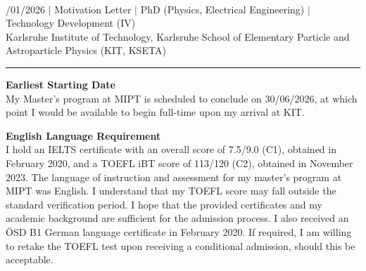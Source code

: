 \documentclass[a4paper,12pt]{article}
\begin{document}
{\centering
  {\scshape {}} \\ 
  {\fontsize{10}{10}/01/2026} $|$
  {\fontsize{10}{10}\selectfont Motivation Letter} $|$
  {\fontsize{10}{10}\selectfont PhD (Physics, Electrical Engineering)} $|$
  {\fontsize{10}{10}\selectfont Technology Development (IV)} \\ 
  {\fontsize{10}{10}\selectfont Karlsruhe Institute of Technology, Karlsruhe
  School of Elementary Particle and Astroparticle Physics (KIT, KSETA)}
\par}
\vspace{-15pt}
\noindent\rule{\textwidth}{0.5pt}

\vspace{-10pt}

\noindent \textbf{Earliest Starting Date}\\
My Master's program at MIPT is scheduled to conclude on 30/06/2026, at which point I would be available to begin full-time upon my arrival at KIT.

\noindent \textbf{English Language Requirement}\\
I hold an IELTS certificate with an overall score of 7.5/9.0 (C1), obtained in February 2020, and a TOEFL iBT score of 113/120 (C2), obtained in November 2023. The language of instruction and assessment for my master’s program at MIPT was English. I understand that my TOEFL score may fall outside the standard verification period. I hope that the provided certificates and my academic background are sufficient for the admission process. I also received an ÖSD B1 German language certificate in February 2020. If required, I am willing to retake the TOEFL test upon receiving a conditional admission, should this be acceptable.
\end{document}

